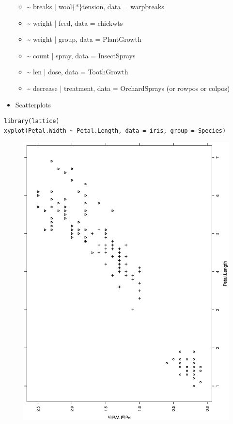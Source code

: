 \documentclass[captions=tableheading]{scrbook}
\begin{document}
\begin{itemize}
\begin{itemize}
\item \~{} breaks | wool\{*\}tension, data = warpbreaks
\item \~{} weight | feed, data = chickwts
\item \~{} weight | group, data = PlantGrowth
\item \~{} count | spray, data = InsectSprays
\item \~{} len | dose, data = ToothGrowth
\item \~{} decrease | treatment, data = OrchardSprays (or rowpos or colpos)
\end{itemize}
\item Scatterplots
\end{itemize}


\begin{verbatim}
library(lattice)
xyplot(Petal.Width ~ Petal.Length, data = iris, group = Species)
\end{verbatim}





\begin{figure}[th]
    \includegraphics[angle=270, totalheight=4in]{img/xyplot-group.ps}
    \caption{}
    \label{fig:xyplot-group}
  \end{figure}
\end{document}

